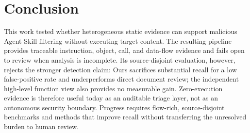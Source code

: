 \section{Conclusion}
\label{sec:conclusion}

This work tested whether heterogeneous static evidence can support malicious
Agent-Skill filtering without executing target content. The resulting pipeline
provides traceable instruction, object, call, and data-flow evidence and fails
open to review when analysis is incomplete. Its source-disjoint evaluation,
however, rejects the stronger detection claim: Ours sacrifices substantial
recall for a low false-positive rate and underperforms direct document review;
the independent high-level function view also provides no measurable gain.
Zero-execution evidence is therefore useful today as an auditable triage layer,
not as an autonomous security boundary. Progress requires flow-rich,
source-disjoint benchmarks and methods that improve recall without transferring
the unresolved burden to human review.
